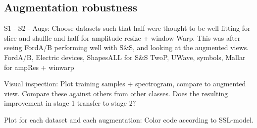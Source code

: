 \documentclass[../../thesis.tex]{subfiles}
\begin{document}
\subsection{Augmentation robustness}

S1 - S2 - Augs: Choose datasets such that half were thought to be well fitting for slice and shuffle and half for amplitude resize + window Warp. This was after seeing FordA/B performing well with S&S, and looking at the augmented views.\newline
FordA/B, Electric devices, ShapesALL for S&S\newline
TwoP, UWave, symbols, Mallar for ampRes + winwarp\newline

Visual inspection: Plot training samples + spectrogram, compare to augmented view. Compare these against others from other classes. \newline
Does the resulting improvement in stage 1 transfer to stage 2? 

Plot for each dataset and each augmentation: 
Color code according to SSL-model.
\end{document}
